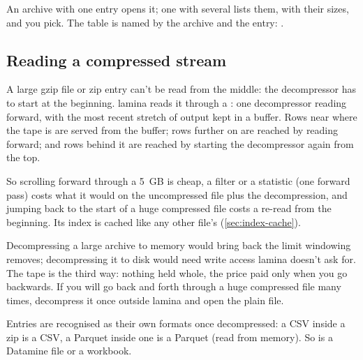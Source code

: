 An archive with one entry opens it; one with several lists them, with their sizes, and you pick. The
table is named by the archive and the entry: .

\subsection{Reading a compressed stream}\label{sec:tape}

A large gzip file or zip entry can't be read from the middle: the decompressor has to start at the
beginning. lamina reads it through a : one decompressor reading forward, with the most recent
stretch of output kept in a buffer. Rows near where the tape is are served from the buffer; rows further
on are reached by reading forward; and rows behind it are reached by starting the decompressor again
from the top.

So scrolling forward through a 5~GB  is cheap, a filter or a statistic (one forward pass)
costs what it would on the uncompressed file plus the decompression, and jumping back to the start of a
huge compressed file costs a re-read from the beginning. Its index is cached like any other file's
(\cref{sec:index-cache}).

\begin{why}
Decompressing a large archive to memory would bring back the limit windowing removes; decompressing it to
disk would need write access lamina doesn't ask for. The tape is the third way: nothing held whole, the
price paid only when you go backwards. If you will go back and forth through a huge compressed file
many times, decompress it once outside lamina and open the plain file.
\end{why}

Entries are recognised as their own formats once decompressed: a CSV inside a zip is a CSV, a Parquet
inside one is a Parquet (read from memory). So is a Datamine file or a workbook.
